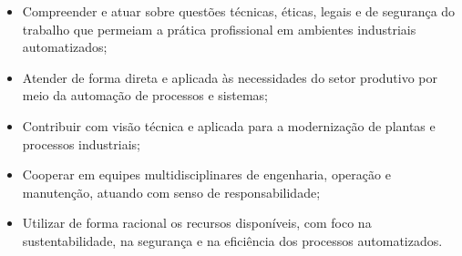 \begin{itemize}
\begin{itemize}
        \item Compreender e atuar sobre questões técnicas, éticas, legais e de segurança do trabalho que permeiam a prática profissional em ambientes industriais automatizados;
        \item Atender de forma direta e aplicada às necessidades do setor produtivo por meio da automação de processos e sistemas;
        \item Contribuir com visão técnica e aplicada para a modernização de plantas e processos industriais;
        \item Cooperar em equipes multidisciplinares de engenharia, operação e manutenção, atuando com senso de responsabilidade;
        \item Utilizar de forma racional os recursos disponíveis, com foco na sustentabilidade, na segurança e na eficiência dos processos automatizados.
    \end{itemize}
\end{itemize}
